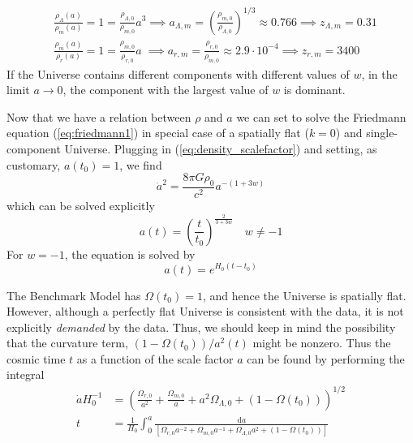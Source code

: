 \begin{align*}
    & \frac{\rho_{\Lambda}(a)}{\rho_{m}(a)}=1=\frac{\rho_{\Lambda,0}}{\rho_{m,0}}a^{3} \implies a_{\Lambda,m} = \left(\frac{\rho_{m,0}}{\rho_{\Lambda,0}}\right)^{1/3} \approx 0.766 \implies z_{\Lambda,m}= 0.31\\
    & \frac{\rho_{m}(a)}{\rho_{r}(a)}=1=\frac{\rho_{m,0}}{\rho_{r,0}}a \; \implies a_{r,m} = \frac{\rho_{r,0}}{\rho_{m,0}} \approx 2.9\cdot 10^{-4} \implies z_{r,m}= 3400
\end{align*}
If the Universe contains different components with different values of $w$, in the limit $a\to 0$, the component with the largest value of $w$ is dominant.
\par Now that we have a relation between $\rho$ and $a$ we can set to solve the Friedmann equation (\ref{eq:friedmann1}) in special case of a spatially flat ($k = 0$) and single-component Universe. Plugging in (\ref{eq:density_scalefactor}) and setting, as customary, $a(t_{0})=1$, we find 
\begin{equation}
    \dot{a}^{2} = \frac{8\pi G \rho_{0}}{c^{2}}a^{-(1+3w)}
\end{equation}
which can be solved explicitly
\begin{equation}
    \boxed{
        a(t) = \left(\frac{t}{t_{0}}\right)^{\frac{2}{3+3w}} \quad w \neq -1
    }
    \label{eq:scalefactor_ev}
\end{equation}
For $w = -1$, the equation is solved by
\begin{equation}
    \boxed{
    a(t) = e^{H_{0}(t-t_{0})}
    }
    \label{eq:scalefactor_ev_cc}
\end{equation}
\par The Benchmark Model has $\Omega(t_{0}) = 1$, and hence the Universe is spatially flat. However, although a perfectly flat Universe is consistent with the data, it is not explicitly \emph{demanded} by the data. Thus, we should keep in mind the possibility that the curvature term, $(1 - \Omega(t_{0}))/a^{2}(t)$ might be nonzero. Thus the cosmic time $t$ as a function of the scale factor $a$ can be found by performing the integral
\begin{align*}
    \dot{a}H_{0}^{-1} &= \left(\frac{\Omega_{r,0}}{a^{2}}+\frac{\Omega_{m,0}}{a}+a^{2}\Omega_{\Lambda,0}+(1-\Omega(t_{0}))\right)^{1/2}\\
    t &= \frac{1}{H_{0}}\int_{0}^{a} \frac{\text{d}a}{\left[\Omega_{r,0}a^{-2}+\Omega_{m,0}a^{-1}+\Omega_{\Lambda,0}a^{2}+(1-\Omega(t_{0}))\right]}
\end{align*}
